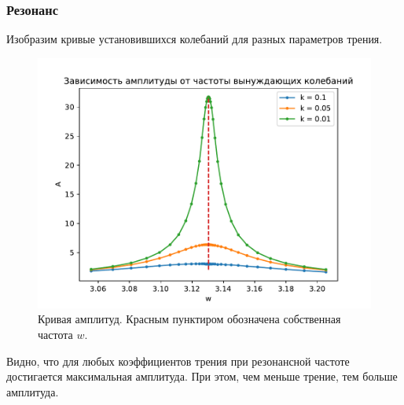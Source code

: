         \subsubsection{Резонанс}
            Изобразим кривые установившихся колебаний для разных параметров трения.
            \begin{figure}[H]
                \centering
                \includegraphics[width=15cm]{pictures/6resonance2.pdf}
                \caption{Кривая амплитуд. Красным пунктиром обозначена собственная частота $w$.}
            \end{figure}
            Видно, что для любых коэффициентов трения при резонансной частоте достигается максимальная амплитуда. При этом, чем меньше трение, тем больше амплитуда.
            